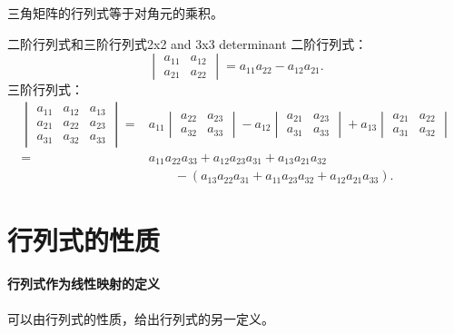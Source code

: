 \begin{corollary}
	三角矩阵的行列式等于对角元的乘积。
\end{corollary}

\begin{example}
	{二阶行列式和三阶行列式}{2x2 and 3x3 determinant}
	二阶行列式：
	\begin{equation}
			\begin{vmatrix}
				a_{11}&a_{12}\\a_{21}&a_{22}
			\end{vmatrix} = a_{11}a_{22} - a_{12}a_{21}.
	\end{equation}
	三阶行列式：
	\begin{equation}
		\begin{aligned}
			\begin{vmatrix}
				a_{11}&a_{12}&a_{13}\\
				a_{21}&a_{22}&a_{23}\\
				a_{31}&a_{32}&a_{33}
			\end{vmatrix} = {}&a_{11}
			\begin{vmatrix}
				a_{22}&a_{23}\\
				a_{32}&a_{33}
			\end{vmatrix} - a_{12}
			\begin{vmatrix}
				a_{21}&a_{23}\\
				a_{31}&a_{33}
			\end{vmatrix} + a_{13}
			\begin{vmatrix}
				a_{21}&a_{22}\\
				a_{31}&a_{32}
			\end{vmatrix}\\
			= {}&a_{11}a_{22}a_{33} + a_{12}a_{23}a_{31} + a_{13}a_{21}a_{32}\\
			&\qquad -(a_{13}a_{22}a_{31} + a_{11}a_{23}a_{32} + a_{12}a_{21}a_{33}).
		\end{aligned}
	\end{equation}
\end{example}

\section{行列式的性质}

\paragraph{行列式作为线性映射的定义}

可以由行列式的性质，给出行列式的另一定义。

